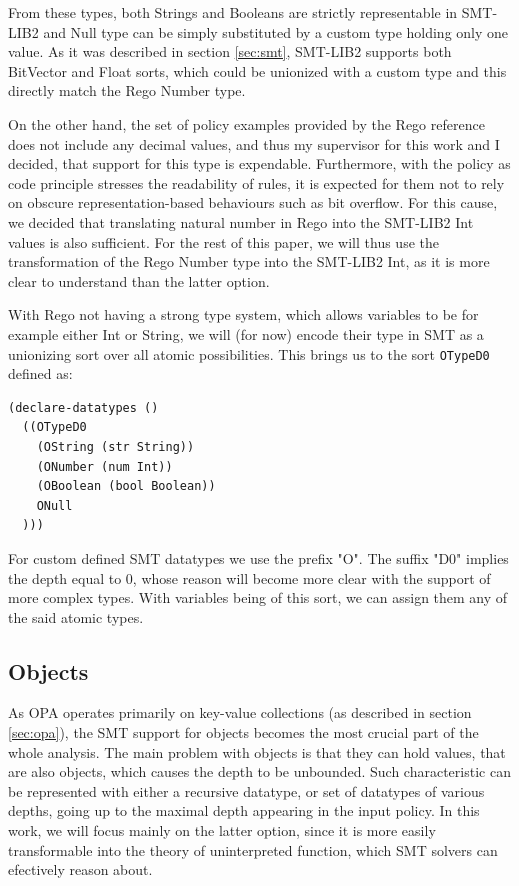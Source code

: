 From these types, both Strings and Booleans are strictly representable in SMT-LIB2 and Null type can be simply substituted by a custom type holding only one value.
As it was described in section \ref{sec:smt}, SMT-LIB2 supports both BitVector and Float sorts, which could be unionized with a custom type and this directly match the Rego Number type.

On the other hand, the set of policy examples  provided by the Rego reference does not include any decimal values, and thus my supervisor for this work and I decided, that support for this type is expendable.
Furthermore, with the policy as code principle stresses the readability of rules, it is expected for them not to rely on obscure representation-based behaviours such as bit overflow.
For this cause, we decided that translating natural number in Rego into the SMT-LIB2 Int values is also sufficient.
For the rest of this paper, we will thus use the transformation of the Rego Number type into the SMT-LIB2 Int, as it is more clear to understand than the latter option.

With Rego not having a strong type system, which allows variables to be for example either Int or String, we will (for now) encode their type in SMT as a unionizing sort over all atomic possibilities.
This brings us to the sort \texttt{OTypeD0} defined as:

\begin{lstlisting}
(declare-datatypes ()
  ((OTypeD0
    (OString (str String))
    (ONumber (num Int))
    (OBoolean (bool Boolean))
    ONull
  )))
\end{lstlisting}

For custom defined SMT datatypes we use the prefix "O".
The suffix "D0" implies the depth equal to $0$, whose reason will become more clear with the support of more complex types.
With variables being of this sort, we can assign them any of the said atomic types.

\subsection{Objects}

As OPA operates primarily on key-value collections (as described in section \ref{sec:opa}), the SMT support for objects becomes the most crucial part of the whole analysis.
The main problem with objects is that they can hold values, that are also objects, which causes the depth to be unbounded.
Such characteristic can be represented with either a recursive datatype, or set of datatypes of various depths, going up to the maximal depth appearing in the input policy.
In this work, we will focus mainly on the latter option, since it is more easily transformable into the theory of uninterpreted function, which SMT solvers can efectively reason about.

